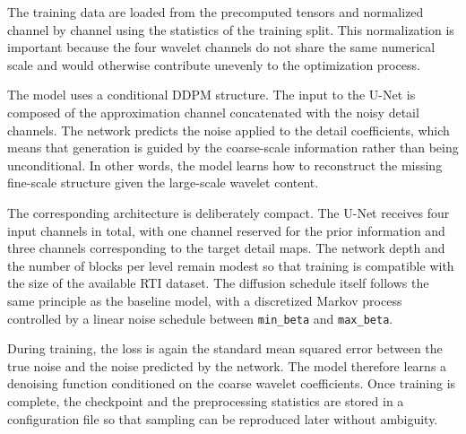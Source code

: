 The training data are loaded from the precomputed tensors and normalized
channel by channel using the statistics of the training split. This
normalization is important because the four wavelet channels do not share the
same numerical scale and would otherwise contribute unevenly to the
optimization process.

The model uses a conditional DDPM structure. The input to the U-Net is composed
of the approximation channel concatenated with the noisy detail channels. The
network predicts the noise applied to the detail coefficients, which means that
generation is guided by the coarse-scale information rather than being
unconditional. In other words, the model learns how to reconstruct the missing
fine-scale structure given the large-scale wavelet content.

The corresponding architecture is deliberately compact. The U-Net receives
four input channels in total, with one channel reserved for the prior
information and three channels corresponding to the target detail maps. The
network depth and the number of blocks per level remain modest so that training
is compatible with the size of the available RTI dataset. The diffusion
schedule itself follows the same principle as the baseline model, with a
discretized Markov process controlled by a linear noise schedule between
\texttt{min\_beta} and \texttt{max\_beta}.

During training, the loss is again the standard mean squared error between the
true noise and the noise predicted by the network. The model therefore learns a
denoising function conditioned on the coarse wavelet coefficients. Once
training is complete, the checkpoint and the preprocessing statistics are
stored in a configuration file so that sampling can be reproduced later without
ambiguity.




